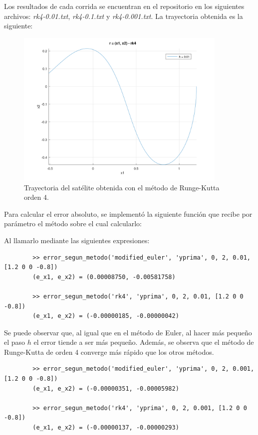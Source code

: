 \documentclass[titlepage,a4paper]{article}
\begin{document}
	Los resultados de cada corrida se encuentran en el repositorio en los siguientes archivos: \emph{rk4-0.01.txt}, \emph{rk4-0.1.txt} y \emph{rk4-0.001.txt}. La trayectoria obtenida es la siguiente:
	
	\begin{figure}[H]
		\centering
		\includegraphics[width=0.9\textwidth]{rk4.png}
		\caption{\label{fig:parted}Trayectoria del satélite obtenida con el método de Runge-Kutta orden 4.}
	\end{figure}

	Para calcular el error absoluto, se implementó la siguiente función que recibe por parámetro el método sobre el cual calcularlo:
	

	Al llamarlo mediante las siguientes expresiones:

	\begin{lstlisting}
		>> error_segun_metodo('modified_euler', 'yprima', 0, 2, 0.01, [1.2 0 0 -0.8])
		(e_x1, e_x2) = (0.00008750, -0.00581758)

		>> error_segun_metodo('rk4', 'yprima', 0, 2, 0.01, [1.2 0 0 -0.8])
		(e_x1, e_x2) = (-0.00000185, -0.00000042)
	\end{lstlisting}

	Se puede observar que, al igual que en el método de Euler, al hacer más pequeño el paso $ h $ el error tiende a ser más pequeño. Además, se observa que el método de Runge-Kutta de orden 4 converge más rápido que los otros métodos.

	\begin{lstlisting}
		>> error_segun_metodo('modified_euler', 'yprima', 0, 2, 0.001, [1.2 0 0 -0.8])
		(e_x1, e_x2) = (-0.00000351, -0.00005982)

		>> error_segun_metodo('rk4', 'yprima', 0, 2, 0.001, [1.2 0 0 -0.8])
		(e_x1, e_x2) = (-0.00000137, -0.00000293)
	\end{lstlisting}
\end{document}

